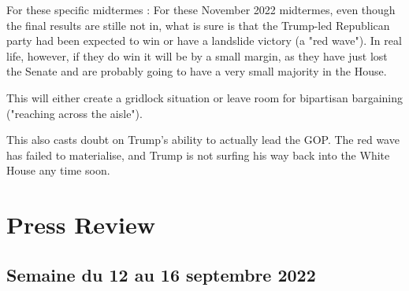 \documentclass[a4paper,12pt]{book}
\begin{document}
\par For these specific midtermes : For these November 2022 midtermes, even though the final results are stille not in, what is sure is that the Trump-led Republican party had been expected to win or have a landslide victory (a "red wave"). In real life, however, if they do win it will be by a small margin, as they have just lost the Senate and are probably going to have a very small majority in the House. \par This will either create a gridlock situation or leave room for bipartisan bargaining ("reaching across the aisle"). \par This also casts doubt on Trump's ability to actually lead the GOP. The red wave has failed to materialise, and Trump is not surfing his way back into the White House any time soon.


















\chapter{Press Review}
\section{Semaine du 12 au 16 septembre 2022}
\end{document}
